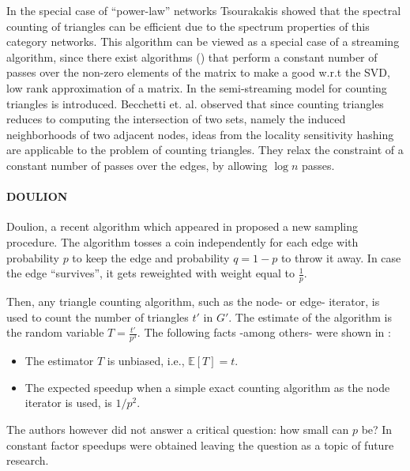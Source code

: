 \documentclass{llncs}
\newcommand{\hide}[1]{}
\newcommand{\Mean}[1]{{\mathbb E}\left[{#1}\right]}
\begin{document}
In the special case of ``power-law'' networks Tsourakakis \cite{me1} showed that the spectral counting of triangles 
can be efficient due to the spectrum properties of this category networks. This algorithm can be viewed as a special case
of a streaming algorithm, since there exist algorithms (\cite{tamas}) that perform a constant number of passes
over the non-zero elements of the matrix to make a good w.r.t the SVD, low rank approximation of a matrix.
In \cite{gionis:spam} the semi-streaming model for counting triangles is introduced. Becchetti et. al. observed
that since counting triangles reduces to computing the intersection of two sets, namely the induced neighborhoods
of two adjacent nodes, ideas from the locality sensitivity hashing \cite{alan} are applicable to the problem of counting
triangles. They relax the constraint of a constant number of passes over the edges, by allowing $\log n$ passes. 
 
\paragraph{DOULION} 

Doulion, a recent algorithm which appeared in \cite{Tsourakakiskdd09} proposed a new sampling procedure. 
The algorithm tosses a coin independently for each edge with probability $p$ to keep the edge and probability $q=1-p$
to throw it away. In case the edge ``survives'', it gets reweighted with weight equal to $\frac{1}{p}$.
\hide{Observe that since the initial graph was unweighted, all edges in the resulting sparsified graph $G'$ have
weight equal to $\frac{1}{p}$,  and thus a single number has to be stored, i.e., $p$. }
Then, any triangle counting algorithm, such as the node- or edge- iterator, is used to count
the number of triangles $t'$ in $G'$.  The estimate of the algorithm is the random variable $T=\frac{t'}{p^3}$.
The following facts  -among others- were shown in \cite{Tsourakakiskdd09}: 
\begin{itemize}
\item The estimator $T$ is unbiased, i.e., $\Mean T=t$.
\item The expected speedup when a simple exact counting algorithm as the node iterator is used, is $1/p^2$. 
\end{itemize}

The authors however did not answer a critical question: how small can $p$ be? In \cite{Tsourakakiskdd09}
constant factor speedups were obtained leaving the question as a topic of future research.
\end{document}

